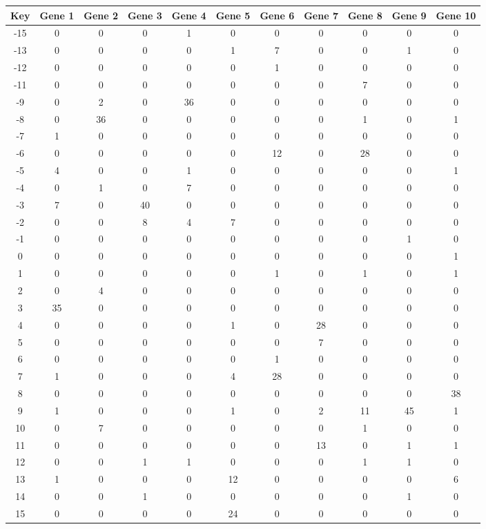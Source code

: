 \begin{tabular}{|c|c|c|c|c|c|c|c|c|c|c|}
\hline
Key & Gene 1 & Gene 2 & Gene 3 & Gene 4 & Gene 5 & Gene 6 & Gene 7 & Gene 8 & Gene 9 & Gene 10 \\
\hline
-15 & 0 & 0 & 0 & 1 & 0 & 0 & 0 & 0 & 0 & 0 \\
-13 & 0 & 0 & 0 & 0 & 1 & 7 & 0 & 0 & 1 & 0 \\
-12 & 0 & 0 & 0 & 0 & 0 & 1 & 0 & 0 & 0 & 0 \\
-11 & 0 & 0 & 0 & 0 & 0 & 0 & 0 & 7 & 0 & 0 \\
-9 & 0 & 2 & 0 & 36 & 0 & 0 & 0 & 0 & 0 & 0 \\
-8 & 0 & 36 & 0 & 0 & 0 & 0 & 0 & 1 & 0 & 1 \\
-7 & 1 & 0 & 0 & 0 & 0 & 0 & 0 & 0 & 0 & 0 \\
-6 & 0 & 0 & 0 & 0 & 0 & 12 & 0 & 28 & 0 & 0 \\
-5 & 4 & 0 & 0 & 1 & 0 & 0 & 0 & 0 & 0 & 1 \\
-4 & 0 & 1 & 0 & 7 & 0 & 0 & 0 & 0 & 0 & 0 \\
-3 & 7 & 0 & 40 & 0 & 0 & 0 & 0 & 0 & 0 & 0 \\
-2 & 0 & 0 & 8 & 4 & 7 & 0 & 0 & 0 & 0 & 0 \\
-1 & 0 & 0 & 0 & 0 & 0 & 0 & 0 & 0 & 1 & 0 \\
0 & 0 & 0 & 0 & 0 & 0 & 0 & 0 & 0 & 0 & 1 \\
1 & 0 & 0 & 0 & 0 & 0 & 1 & 0 & 1 & 0 & 1 \\
2 & 0 & 4 & 0 & 0 & 0 & 0 & 0 & 0 & 0 & 0 \\
3 & 35 & 0 & 0 & 0 & 0 & 0 & 0 & 0 & 0 & 0 \\
4 & 0 & 0 & 0 & 0 & 1 & 0 & 28 & 0 & 0 & 0 \\
5 & 0 & 0 & 0 & 0 & 0 & 0 & 7 & 0 & 0 & 0 \\
6 & 0 & 0 & 0 & 0 & 0 & 1 & 0 & 0 & 0 & 0 \\
7 & 1 & 0 & 0 & 0 & 4 & 28 & 0 & 0 & 0 & 0 \\
8 & 0 & 0 & 0 & 0 & 0 & 0 & 0 & 0 & 0 & 38 \\
9 & 1 & 0 & 0 & 0 & 1 & 0 & 2 & 11 & 45 & 1 \\
10 & 0 & 7 & 0 & 0 & 0 & 0 & 0 & 1 & 0 & 0 \\
11 & 0 & 0 & 0 & 0 & 0 & 0 & 13 & 0 & 1 & 1 \\
12 & 0 & 0 & 1 & 1 & 0 & 0 & 0 & 1 & 1 & 0 \\
13 & 1 & 0 & 0 & 0 & 12 & 0 & 0 & 0 & 0 & 6 \\
14 & 0 & 0 & 1 & 0 & 0 & 0 & 0 & 0 & 1 & 0 \\
15 & 0 & 0 & 0 & 0 & 24 & 0 & 0 & 0 & 0 & 0 \\
\hline
\end{tabular}